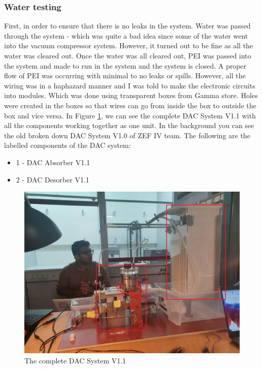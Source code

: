 \subsubsection{Water testing}
\label{sec:watertest}

First, in order to ensure that there is no leaks in the system. Water was passed through the system - which was quite a bad idea since some of the water went into the vacuum compressor system. However, it turned out to be fine as all the water was cleared out. Once the water was all cleared out, PEI was passed into the system and made to run in the system and the system is closed. A proper flow of PEI was occurring with minimal to no leaks or spills. However, all the wiring was in a haphazard manner and I was told to make the electronic circuits into modules. Which was done using transparent boxes from Gamma store. Holes were created in the boxes so that wires can go from inside the box to outside the box and vice versa.
\bigbreak 
In Figure \ref{fig:dacsystem1.1}, we can see the complete DAC System V1.1 with all the components working together as one unit. In the background you can see the old broken down DAC System V1.0 of ZEF IV team. The following are the labelled components of the DAC system: 

\begin{itemize}
    \item 1 - DAC Absorber V1.1 
    \item 2 - DAC Desorber V1.1 
\end{itemize}

\begin{figure}[H]
    \centering
    \includegraphics[scale = 0.45]{images/mywork/Sprint2/dacsystem1.png}
    \caption{The complete DAC System V1.1 }
    \label{fig:dacsystem1.1}
\end{figure}


